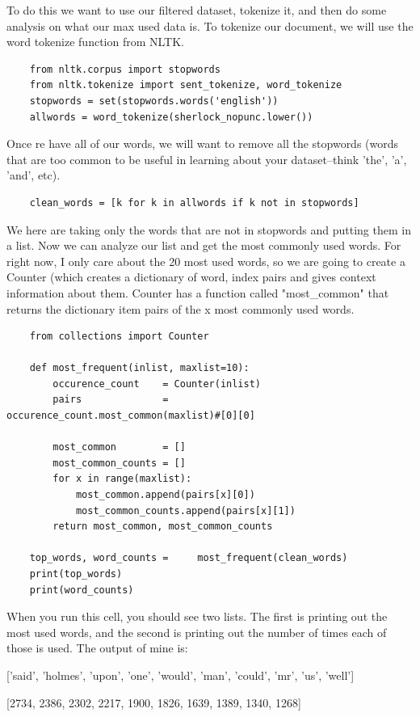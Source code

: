 \documentclass{article}
\begin{document}
 To do this we want to use our filtered dataset, tokenize it, and then do some analysis on what our max used data is. To tokenize our document,  we will use the word tokenize function from NLTK.
  \begin{verbatim}
    from nltk.corpus import stopwords
    from nltk.tokenize import sent_tokenize, word_tokenize
    stopwords = set(stopwords.words('english')) 
    allwords = word_tokenize(sherlock_nopunc.lower())
 \end{verbatim}
 Once re have all of our words, we will want to remove all the stopwords (words that are too common to be useful in learning about your dataset--think 'the', 'a', 'and', etc).
 \begin{verbatim}
    clean_words = [k for k in allwords if k not in stopwords]
 \end{verbatim}
 We here are taking only the words that are not in stopwords and putting them in a list. Now we can analyze our list and get the most commonly used words. For right now, I only care about the 20 most used words, so we are going to create a Counter (which creates a dictionary of word, index pairs and gives context information about them. Counter has a function called "most\_common" that returns the dictionary item pairs of the x most commonly used words.
 
\begin{verbatim}
    from collections import Counter

    def most_frequent(inlist, maxlist=10):
        occurence_count    = Counter(inlist)
        pairs              =               occurence_count.most_common(maxlist)#[0][0]

        most_common        = []
        most_common_counts = []
        for x in range(maxlist):
            most_common.append(pairs[x][0])
            most_common_counts.append(pairs[x][1])
        return most_common, most_common_counts

    top_words, word_counts =     most_frequent(clean_words)
    print(top_words)
    print(word_counts)
\end{verbatim}
When you run this cell, you should see two lists. The first is printing out the most used words, and the second is printing out the number of times each of those is used. 
The output of mine is: 

['said', 'holmes', 'upon', 'one', 'would', 'man', 'could', 'mr', 'us', 'well']

[2734, 2386, 2302, 2217, 1900, 1826, 1639, 1389, 1340, 1268]
\end{document}
